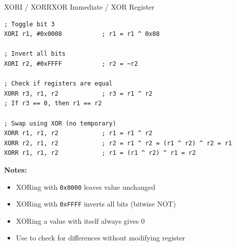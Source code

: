\begin{instructionbox}{XORI / XORR}{XOR Immediate / XOR Register}
	\begin{example}
		\begin{lstlisting}
; Toggle bit 3
XORI r1, #0x0008           ; r1 = r1 ^ 0x08

; Invert all bits
XORI r2, #0xFFFF           ; r2 = ~r2

; Check if registers are equal
XORR r3, r1, r2            ; r3 = r1 ^ r2
; If r3 == 0, then r1 == r2

; Swap using XOR (no temporary)
XORR r1, r1, r2            ; r1 = r1 ^ r2
XORR r2, r1, r2            ; r2 = r1 ^ r2 = (r1 ^ r2) ^ r2 = r1
XORR r1, r1, r2            ; r1 = (r1 ^ r2) ^ r1 = r2
		\end{lstlisting}
		\caption{Bit Toggling, Equality Testing, and XOR Swap}
	\end{example}

	\textbf{Notes:}
	\begin{itemize}
		\item XORing with \texttt{0x0000} leaves value unchanged
		\item XORing with \texttt{0xFFFF} inverts all bits (bitwise NOT)
		\item XORing a value with itself always gives 0
		\item Use  to check for differences without modifying register
	\end{itemize}
\end{instructionbox}

